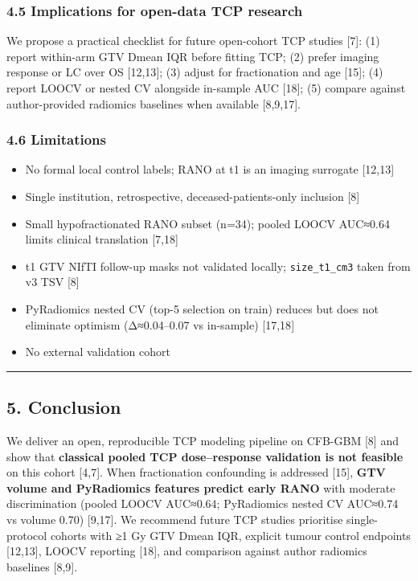 \documentclass[
  11pt,
]{article}
\providecommand{\tightlist}{%
  \setlength{\itemsep}{0pt}\setlength{\parskip}{0pt}}
\begin{document}
\subsubsection{4.5 Implications for open-data TCP
research}\label{implications-for-open-data-tcp-research}

We propose a practical checklist for future open-cohort TCP studies
{[}7{]}: (1) report within-arm GTV Dmean IQR before fitting TCP; (2)
prefer imaging response or LC over OS {[}12,13{]}; (3) adjust for
fractionation and age {[}15{]}; (4) report LOOCV or nested CV alongside
in-sample AUC {[}18{]}; (5) compare against author-provided radiomics
baselines when available {[}8,9,17{]}.

\subsubsection{4.6 Limitations}\label{limitations}

\begin{itemize}
\tightlist
\item
  No formal local control labels; RANO at t1 is an imaging surrogate
  {[}12,13{]}
\item
  Single institution, retrospective, deceased-patients-only inclusion
  {[}8{]}
\item
  Small hypofractionated RANO subset (n=34); pooled LOOCV AUC≈0.64
  limits clinical translation {[}7,18{]}
\item
  t1 GTV NIfTI follow-up masks not validated locally;
  \texttt{size\_t1\_cm3} taken from v3 TSV {[}8{]}
\item
  PyRadiomics nested CV (top-5 selection on train) reduces but does not
  eliminate optimism (Δ≈0.04--0.07 vs in-sample) {[}17,18{]}
\item
  No external validation cohort
\end{itemize}

\begin{center}\rule{0.5\linewidth}{0.5pt}\end{center}

\subsection{5. Conclusion}\label{conclusion}

We deliver an open, reproducible TCP modeling pipeline on CFB-GBM
{[}8{]} and show that \textbf{classical pooled TCP dose--response
validation is not feasible} on this cohort {[}4,7{]}. When fractionation
confounding is addressed {[}15{]}, \textbf{GTV volume and PyRadiomics
features predict early RANO} with moderate discrimination (pooled LOOCV
AUC≈0.64; PyRadiomics nested CV AUC≈0.74 vs volume 0.70) {[}9,17{]}. We
recommend future TCP studies prioritise single-protocol cohorts with ≥1
Gy GTV Dmean IQR, explicit tumour control endpoints {[}12,13{]}, LOOCV
reporting {[}18{]}, and comparison against author radiomics baselines
{[}8,9{]}.
\end{document}
